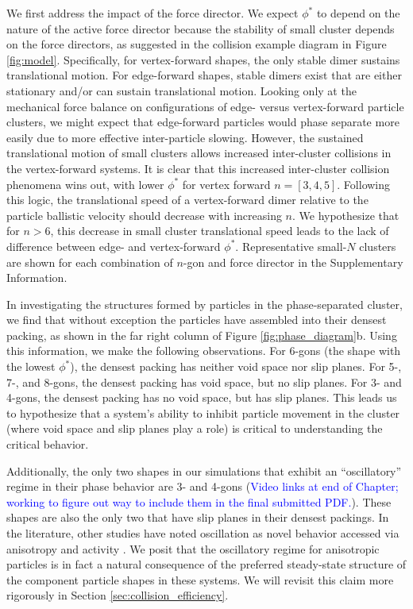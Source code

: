 We first address the impact of the force director.
We expect $\phi^*$ to depend on the nature of  the active force director because the stability of small cluster depends on the force directors, as suggested in the collision example diagram in Figure \ref{fig:model}.
Specifically, for vertex-forward shapes, the only stable dimer sustains translational motion.
For edge-forward shapes, stable dimers exist that are either stationary and/or can sustain translational motion.
Looking only at the mechanical force balance on configurations of edge- versus vertex-forward particle clusters, we might expect that edge-forward particles would phase separate more easily due to more effective inter-particle slowing.
However, the sustained translational motion of small clusters allows increased inter-cluster collisions in the vertex-forward systems.
It is clear that this increased inter-cluster collision phenomena wins out, with lower $\phi^*$ for vertex forward $n=[3,4,5]$.
Following this logic, the translational speed of a vertex-forward dimer relative to the particle ballistic velocity should  decrease with increasing $n$.
We hypothesize that for $n>6$, this decrease in small cluster translational speed leads to the lack of difference between edge- and vertex-forward $\phi^*$.
Representative small-$N$ clusters are shown for each combination of $n$-gon and force director in the Supplementary Information.

In investigating the structures formed by particles in the phase-separated cluster, we find that without exception the particles have assembled into their densest packing, as shown in the far right column of Figure \ref{fig:phase_diagram}b.
Using this information, we make the following observations.
For 6-gons (the shape with the lowest $\phi^*$), the densest packing has neither void space nor slip planes.
For 5-, 7-, and 8-gons, the densest packing has void space, but no slip planes.
For 3- and 4-gons, the densest packing has no void space, but has slip planes.
This leads us to hypothesize that a system's ability to inhibit particle movement in the cluster (where void space and slip planes play a role) is critical to understanding the critical behavior.

Additionally, the only two shapes in our simulations that exhibit an ``oscillatory'' regime in their phase behavior are 3- and 4-gons (\textcolor{blue}{Video links at end of Chapter; working to figure out way to include them in the final submitted PDF.}).
These shapes are also the only two that have slip planes in their densest packings.
In the literature, other studies have noted oscillation as novel behavior accessed via anisotropy and activity \cite{Prymidis_2016_SoftMatter, Feng_2019_SoftMatter}.
We posit that the oscillatory regime for anisotropic particles is in fact a natural consequence of the preferred steady-state structure of the component particle shapes in these systems.
We will revisit this claim more rigorously in Section \ref{sec:collision_efficiency}.

